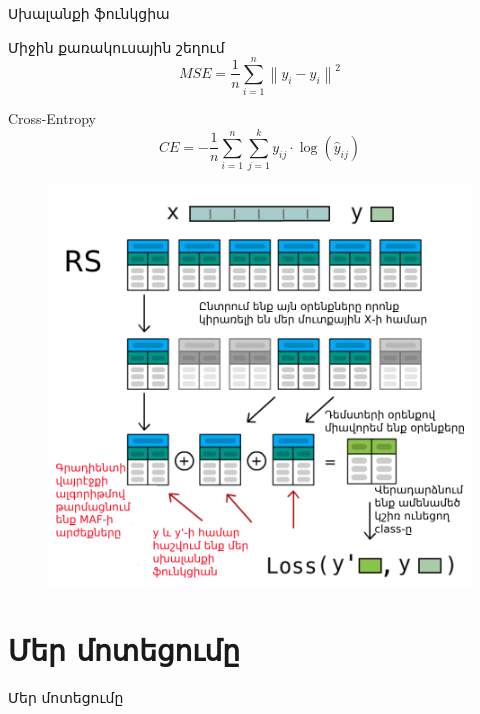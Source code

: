 \documentclass[aspectratio=169]{beamer}
\begin{document}
\begin{frame}{Սխալանքի ֆունկցիա}
    \begin{block}{Միջին քառակուսային շեղում}
        \begin{equation}
MSE = \frac{1}{n} \sum_{i=1}^{n} \left\| y_i - \hat{y}_i \right\|^2
        \end{equation}
    \end{block}
    \begin{block}{{\rm Cross-Entropy}}
        \begin{equation}
        CE = - \frac{1}{n} \sum_{i=1}^{n} \sum_{j=1}^{k} y_{ij} \cdot \log(\hat{y}_{ij})
        \end{equation}
    
    \end{block}
        
\end{frame}
\begin{figure}
    \centering
    \includegraphics[width=0.55\linewidth]{../../fig/dst_ill.png}
\end{figure}




\section{Մեր մոտեցումը}
\begin{frame}
    \begin{center}
        \Huge Մեր մոտեցումը
    \end{center}
\end{frame}
\end{document}
